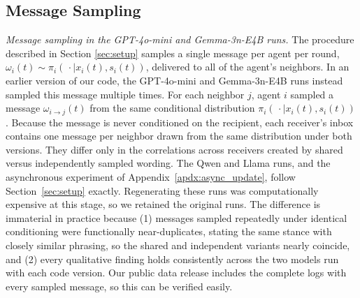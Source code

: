 \subsection{Message Sampling}
\textit{Message sampling in the GPT-4o-mini and Gemma-3n-E4B runs.} The procedure described in Section \ref{sec:setup}  samples a single message per agent per round, $\omega_i(t) \sim \pi_i(\,\cdot \mid x_i(t), s_i(t))$, delivered to all of the agent's neighbors. In an earlier version of our code, the GPT-4o-mini and Gemma-3n-E4B runs instead sampled this message multiple times. For each neighbor $j$, agent $i$ sampled a message $\omega_{i \to j}(t)$ from the same conditional distribution $\pi_i(\,\cdot \mid x_i(t), s_i(t))$. Because the message is never conditioned on the recipient, each receiver's inbox contains one message per neighbor drawn from the same distribution under both versions. They differ only in the correlations across receivers created by shared versus independently sampled wording. The Qwen and Llama runs, and the asynchronous experiment of Appendix~\ref{apdx:async_update}, follow  Section~\ref{sec:setup} exactly. Regenerating these runs was computationally expensive at this stage, so we retained the original runs. The difference is immaterial in practice because (1) messages sampled repeatedly under identical conditioning were functionally near-duplicates, stating the same stance with closely similar phrasing, so the shared and independent variants nearly coincide, and (2) every qualitative finding holds consistently across the two models run with each code version. Our public data release includes the complete logs with every sampled message, so this can be verified easily.
